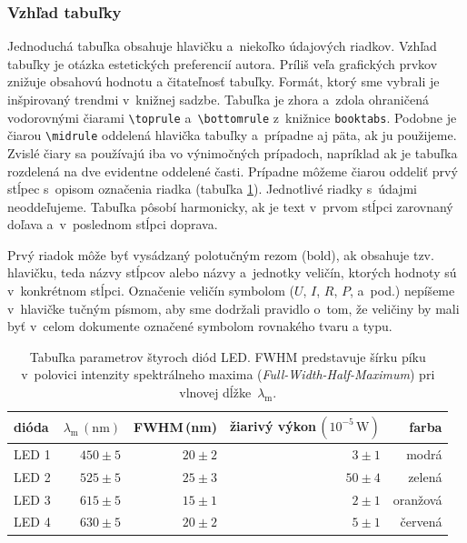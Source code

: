 \documentclass[../../../thesis.tex]{subfiles}
\begin{document}
\subsubsection{Vzhľad tabuľky}
Jednoduchá tabuľka obsahuje hlavičku a~niekoľko
údajových riadkov.
Vzhľad tabuľky je otázka estetických preferencií autora.
Príliš veľa grafických prvkov znižuje obsahovú hodnotu a čitateľnosť tabuľky.
Formát, ktorý sme vybrali je inšpirovaný trendmi
v~knižnej sadzbe.
Tabuľka je zhora a~zdola ohraničená vodorovnými čiarami
\verb|\toprule| a~\verb|\bottomrule| z~knižnice \verb|booktabs|.
Podobne je čiarou \verb|\midrule| oddelená hlavička tabuľky
a~prípadne aj päta, ak ju použijeme.
Zvislé čiary sa používajú iba vo výnimočných prípadoch,
napríklad ak je tabuľka rozdelená na
dve evidentne oddelené časti.
Prípadne môžeme čiarou oddeliť prvý stĺpec s~opisom označenia riadka (tabuľka \ref{tab:LED}).
Jednotlivé riadky s~údajmi neoddeľujeme.
Tabuľka pôsobí harmonicky,
ak je text v~prvom stĺpci zarovnaný doľava
a~v~poslednom stĺpci doprava.

Prvý riadok môže byť vysádzaný polotučným
rezom (bold),
ak obsahuje tzv. hlavičku, teda názvy stĺpcov alebo názvy
a~jednotky veličín, ktorých hodnoty sú v~konkrétnom stĺpci.
Označenie veličín symbolom ($U$, $I$, $R$, $P$, a~pod.)
nepíšeme v~hlavičke tučným písmom,
aby sme dodržali pravidlo o~tom,
že veličiny by mali byť v~celom dokumente označené symbolom
rovnakého tvaru a typu.

\begin{table}[h!]
  \caption{Tabuľka parametrov štyroch diód LED.
  FWHM predstavuje šírku píku v~polovici intenzity
  spektrálneho maxima (\foreignlanguage{english}{\emph{Full-Width-Half-Maximum}}) pri vlnovej dĺžke~$\lambda_\mathrm m$.}
  \label{tab:LED}
  \centering
  \begin{tabular}{@{}l|rrrr@{}}
    \toprule
    dióda & $\lambda_\mathrm m\,(\mathrm{nm})$ & FWHM\,(nm) & žiarivý výkon\,$(10^{-5}\,\mathrm W)$ & farba \\
    \midrule
    LED 1 & $450 \pm 5$ & $20\pm2$ & $3\pm1$ & modrá\\
    LED 2 & $525 \pm 5$ & $25\pm3$ & $50\pm4$ & zelená\\
    LED 3 & $615 \pm 5$ & $15\pm1$ & $2\pm1$ & oranžová\\
    LED 4 & $630 \pm 5$ & $20\pm2$ & $5\pm1$ & červená\\
    \bottomrule
  \end{tabular}
\end{table}
\end{document}

